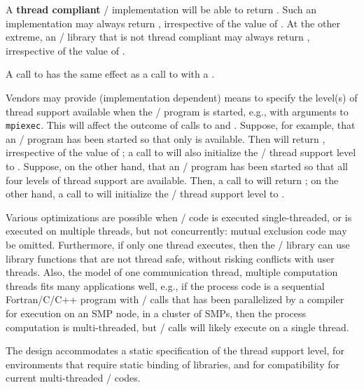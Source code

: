 A {\bf thread compliant} \MPI/ implementation will be able to return
\newline
{}. 
Such an implementation may always return
\newline
{}, irrespective of the value
of .
At the other extreme, an \MPI/ library that is not thread compliant
may always return , 
irrespective of the value of .

A call to  has the same effect as a
call to  with a . 

Vendors may provide (implementation
dependent) means to specify the level(s) of  thread support available when the \MPI/
%
program is started, e.g., with arguments to {\tt mpiexec}.  This
will affect the outcome of calls to  and
.  Suppose, for example, that an \MPI/
program has been started so that only  is
available.  Then    will return
, irrespective of the value
of ; a call to  will also
initialize the \MPI/ thread support level  to
.  Suppose, on the other hand, that an
\MPI/ program has been started so that all four levels of thread
support are available.  Then, a call to 
will return ; on the other hand, a call to
 will initialize the \MPI/ thread support level to
.    


\begin{rationale}
Various optimizations are possible when \MPI/ code is executed
single-threaded, or is executed on multiple threads, but not
concurrently:  mutual exclusion code may be omitted. Furthermore, if only one
thread executes, then the \MPI/ library can use library functions that
are not thread safe, without risking conflicts with user threads.
Also, the model
of one communication thread, multiple computation threads fits 
many applications well, e.g., 
if the process code is a sequential
Fortran/C/C++ program with \MPI/ calls that has been parallelized by a
compiler for execution on an SMP node, in a cluster of SMPs,
then the process computation is
multi-threaded, but \MPI/ calls will likely execute on a single
thread.

The design accommodates a static specification of the thread support
level, for environments that require static binding of libraries, and
for compatibility for current multi-threaded \MPI/ codes.
\end{rationale}

